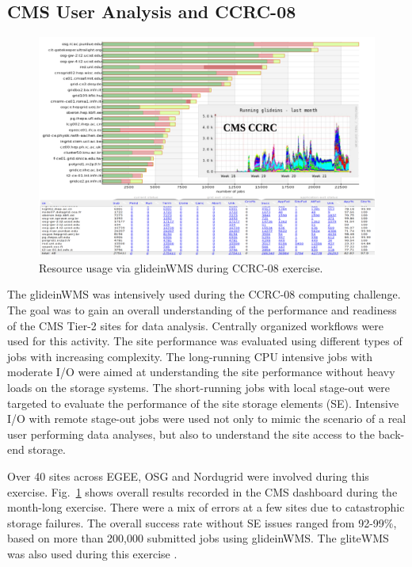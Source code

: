 \documentclass[a4paper]{jpconf}
\begin{document}
\subsection{CMS User Analysis and CCRC-08}
\begin{figure}
\begin{center}
\includegraphics[scale=0.55]{glideins_ccrc08}
\end{center}
\caption{Resource usage via glideinWMS during CCRC-08 exercise.}
\label{fig:glideins_ccrc}
\end{figure}
The glideinWMS was intensively used during the CCRC-08 computing challenge. The goal was to gain an overall understanding 
of the performance and readiness of the CMS Tier-2 sites for data analysis. 
Centrally organized workflows were used for this activity. The site performance
was evaluated using different types of jobs with increasing complexity. The long-running 
CPU intensive jobs with moderate I/O were aimed at understanding the site performance without
heavy loads on the storage systems. The short-running jobs with local stage-out were targeted
to evaluate the performance of the site storage elements (SE). Intensive I/O with remote stage-out
jobs were used not only to mimic the scenario of a real user performing data analyses, but also
to understand the site access to the back-end storage.

Over 40 sites across EGEE, OSG and Nordugrid were involved during this exercise. Fig.~\ref{fig:glideins_ccrc} 
shows overall results recorded in the CMS dashboard 
during the month-long exercise. There were a mix of errors at a few sites due to catastrophic storage 
failures. The overall success rate without SE issues ranged from 92-99\%, based on more than 200,000 
submitted jobs using glideinWMS. The gliteWMS was also used during this exercise \cite{bib:cms_glite}.
\end{document}
